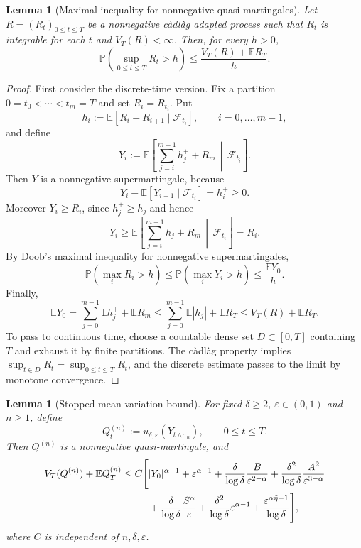 \documentclass[10pt,a4paper]{amsart}
\newtheorem{lemma}[theorem]{Lemma}
\newcommand{\E}{\mathbb{E}}
\newcommand{\Pbb}{\mathbb{P}}
\newcommand{\F}{\mathcal{F}}
\newcommand{\1}{\mathbf{1}}
\newcommand{\wt}{\tilde}
\newcommand{\eps}{\varepsilon}
\begin{document}
\begin{lemma}[Maximal inequality for nonnegative quasi-martingales]\label{lem:qm-max}
Let $R=(R_t)_{0\le t\le T}$ be a nonnegative c\`adl\`ag adapted process such that $R_t$ is integrable for each $t$ and $V_T(R)<\infty$. Then, for every $h>0$,
\[
  \Pbb\left(\sup_{0\le t\le T}R_t>h\right)
  \le \frac{V_T(R)+\E R_T}{h}.
\]
\end{lemma}

\begin{proof}
First consider the discrete-time version. Fix a partition $0=t_0<\cdots<t_m=T$ and set $R_i=R_{t_i}$. Put
\[
  h_i:=\E[R_i-R_{i+1}\mid\F_{t_i}],
  \qquad i=0,\dots,m-1,
\]
and define
\[
  Y_i:=\E\left[\sum_{j=i}^{m-1}h_j^+ + R_m\,\middle|\,\F_{t_i}\right].
\]
Then $Y$ is a nonnegative supermartingale, because
\[
  Y_i-\E[Y_{i+1}\mid\F_{t_i}]=h_i^+\ge0.
\]
Moreover $Y_i\ge R_i$, since $h_j^+\ge h_j$ and hence
\[
Y_i\ge \E\left[\sum_{j=i}^{m-1}h_j+R_m\,\middle|\,\F_{t_i}\right]=R_i.
\]
By Doob's maximal inequality for nonnegative supermartingales,
\[
  \Pbb\left(\max_i R_i>h\right)
  \le \Pbb\left(\max_i Y_i>h\right)
  \le \frac{\E Y_0}{h}.
\]
Finally,
\[
  \E Y_0=\sum_{j=0}^{m-1}\E h_j^+ + \E R_m
  \le \sum_{j=0}^{m-1}\E |h_j|+\E R_T
  \le V_T(R)+\E R_T.
\]
To pass to continuous time, choose a countable dense set $D\subset[0,T]$ containing $T$ and exhaust it by finite partitions. The c\`adl\`ag property implies $\sup_{t\in D}R_t=\sup_{0\le t\le T}R_t$, and the discrete estimate passes to the limit by monotone convergence.
\end{proof}

\begin{lemma}[Stopped mean variation bound]\label{lem:stopped-mean-variation}
For fixed $\delta\ge2$, $\eps\in(0,1)$ and $n\ge1$, define
\[
  Q_t^{(n)}:=u_{\delta,\eps}(Y_{t\wedge\tau_n}),
  \qquad 0\le t\le T.
\]
Then $Q^{(n)}$ is a nonnegative quasi-martingale, and
\begin{align}
V_T(Q^{(n)})+\E Q_T^{(n)}
\le C\Bigg[&|Y_0|^{\alpha-1}
+\eps^{\alpha-1}
+\frac{\delta}{\log\delta}\frac{B}{\eps^{2-\alpha}}
+\frac{\delta^2}{\log\delta}\frac{A^2}{\eps^{3-\alpha}} \notag\\
&+\frac{\delta}{\log\delta}\frac{S^\alpha}{\eps}
+\frac{\delta^2}{\log\delta}\eps^{\alpha-1}
+\frac{\eps^{\alpha\wt\eta-1}}{\log\delta}
\Bigg], \label{eq:stopped-mean-variation-bound}
\end{align}
where $C$ is independent of $n,\delta,\eps$.
\end{lemma}
\end{document}
